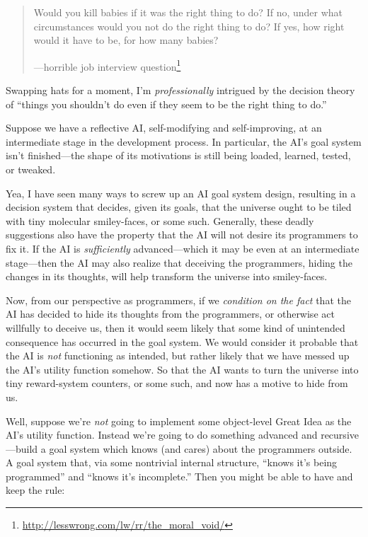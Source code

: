 \myendsectiontext


\begin{quote}

 Would you kill babies if it was the right thing to do? If no,
under what circumstances would you not do the right thing to do? If
yes, how right would it have to be, for how many babies?

{\raggedleft
 {}---horrible job interview question\footnote{\url{http://lesswrong.com/lw/rr/the_moral_void/}}
\par}
\end{quote}



 Swapping hats for a moment, I'm
\textit{professionally} intrigued by the decision theory of
``things you shouldn't do even if they
seem to be the right thing to do.''


 Suppose we have a reflective AI, self-modifying and
self-improving, at an intermediate stage in the development process. In
particular, the AI's goal system isn't
finished---the shape of its motivations is still being loaded, learned,
tested, or tweaked.


 Yea, I have seen many ways to screw up an AI goal system design,
resulting in a decision system that decides, given its goals, that the
universe ought to be tiled with tiny molecular smiley-faces, or some
such. Generally, these deadly suggestions also have the property that
the AI will not desire its programmers to fix it. If the AI is
\textit{sufficiently} advanced---which it may be even at an
intermediate stage---then the AI may also realize that deceiving the
programmers, hiding the changes in its thoughts, will help transform
the universe into smiley-faces.


 Now, from our perspective as programmers, if we \textit{condition
on the fact} that the AI has decided to hide its thoughts from the
programmers, or otherwise act willfully to deceive us, then it would
seem likely that some kind of unintended consequence has occurred in
the goal system. We would consider it probable that the AI is
\textit{not} functioning as intended, but rather likely that we have
messed up the AI's utility function somehow. So that
the AI wants to turn the universe into tiny reward-system counters, or
some such, and now has a motive to hide from us.


 Well, suppose we're \textit{not} going to
implement some object-level Great Idea as the AI's
utility function. Instead we're going to do something
advanced and recursive---build a goal system which knows (and cares)
about the programmers outside. A goal system that, via some nontrivial
internal structure, ``knows it's being
programmed'' and ``knows
it's incomplete.'' Then you might be
able to have and keep the rule:

